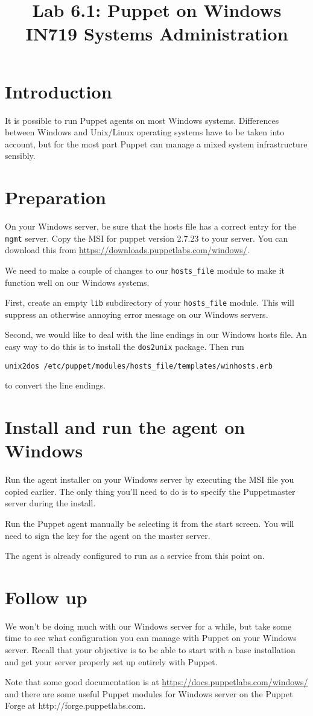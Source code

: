 \documentclass{article}   	%
\title{Lab 6.1:  Puppet on Windows\\ IN719 Systems Administration}
\date{}							%
\begin{document}
\maketitle

\section*{Introduction}
It is possible to run Puppet agents on most Windows systems.  Differences between Windows and Unix/Linux operating systems have to be taken into account, but for the most part Puppet can manage a mixed system infrastructure sensibly.

\section{Preparation}
On your Windows server, be sure that the hosts file has a correct entry for the \texttt{mgmt} server.  Copy the MSI for puppet version 2.7.23 to your server. You can download this from \url{https://downloads.puppetlabs.com/windows/}.

We need to make a couple of changes to our \texttt{hosts\_file} module to make it function well on our Windows systems.

First, create an empty \texttt{lib} subdirectory of your \texttt{hosts\_file} module.  This will suppress an otherwise annoying error message on our Windows servers.

Second, we would like to deal with the line endings in our Windows hosts file.  An easy way to do this is to install the \texttt{dos2unix} package.  Then run

\texttt{unix2dos /etc/puppet/modules/hosts\_file/templates/winhosts.erb}

to convert the line endings.

\section{Install and run the agent on Windows}
Run the agent installer on your Windows server by executing the MSI file you copied earlier.  The only thing you'll need to do is to specify the Puppetmaster server during the install.

Run the Puppet agent manually be selecting it from the start screen. You will need to sign the key for the agent on the master server.

The agent is already configured to run as a service from this point on.

\section{Follow up}
We won't be doing much with our Windows server for a while, but take some time to see what configuration you can manage with Puppet on your Windows server.  Recall that your objective is to be able to start with a base installation and get your server properly set up entirely with Puppet.

Note that some good documentation is at \url{https://docs.puppetlabs.com/windows/} and there are some useful Puppet modules for Windows server on the Puppet Forge at http://forge.puppetlabs.com.
\end{document}
